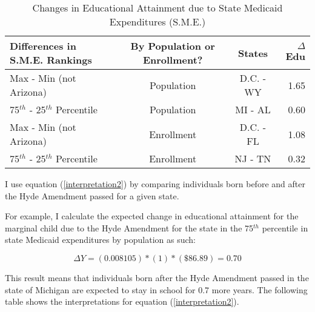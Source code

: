             \begin{table}[H]
                \caption{Changes in Educational Attainment due to State Medicaid Expenditures (S.M.E.)}
                \centering\footnotesize{
                \begin{tabular}{lccr}
                \hline
                Differences in S.M.E. Rankings & By Population or Enrollment? & States & $\Delta$Edu\\
                \hline
                Max - Min (not Arizona) & Population & D.C. - WY & 1.65 \\
                75$^{th}$ - 25$^{th}$ Percentile & Population & MI - AL & 0.60 \\
                Max - Min (not Arizona) & Enrollment & D.C. - FL & 1.08 \\
                75$^{th}$ - 25$^{th}$ Percentile & Enrollment & NJ - TN & 0.32 \\
                \hline
                \end{tabular}}
            \end{table}


        I use equation (\ref{interpretation2}) by comparing individuals born before and after the Hyde Amendment passed for a given state.

        For example, I calculate the expected change in educational attainment for the marginal child due to the Hyde Amendment for the state in the 75$^{th}$ percentile in state Medicaid expenditures by population as such:

            \begin{equation}\label{interpretation4}
                \Delta Y = (0.008105)*(1)*(\$86.89) = 0.70
            \end{equation}

        This result means that individuals born after the Hyde Amendment passed in the state of Michigan are expected to stay in school for 0.7 more years. The following table shows the interpretations for equation (\ref{interpretation2}).

